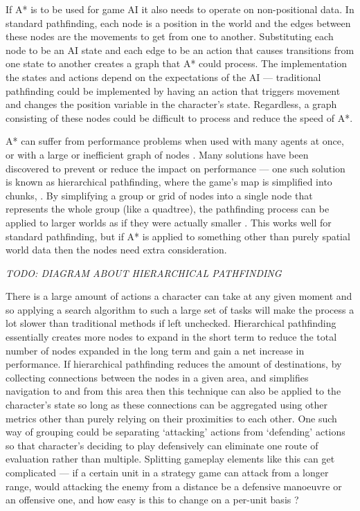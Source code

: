 \documentclass[11pt, a4paper]{article}
\begin{document}
If A* is to be used for game AI it also needs to operate on non-positional data. In standard pathfinding, each node is a position in the world and the edges between these nodes are the movements to get from one to another. Substituting each node to be an AI state and each edge to be an action that causes transitions from one state to another creates a graph that A* could process. The implementation the states and actions depend on the expectations of the AI --- traditional pathfinding could be implemented by having an action that triggers movement and changes the position variable in the character's state. Regardless, a graph consisting of these nodes could be difficult to process and reduce the speed of A*.

A* can suffer from performance problems when used with many agents at once, or with a large or inefficient graph of nodes \parencite{graham2003pathfinding}. Many solutions have been discovered to prevent or reduce the impact on performance --- one such solution is known as hierarchical pathfinding, where the game's map is simplified into chunks, \parencite[126]{cui2011based}. By simplifying a group or grid of nodes into a single node that represents the whole group (like a quadtree), the pathfinding process can be applied to larger worlds as if they were actually smaller \parencite{botea2004near}. This works well for standard pathfinding, but if A* is applied to something other than purely spatial world data then the nodes need extra consideration. 

\emph{TODO: DIAGRAM ABOUT HIERARCHICAL PATHFINDING}

There is a large amount of actions a character can take at any given moment \parencite[62]{nareyek2004ai} and so applying a search algorithm to such a large set of tasks will make the process a lot slower than traditional methods if left unchecked. Hierarchical pathfinding essentially creates more nodes to expand in the short term to reduce the total number of nodes expanded in the long term and gain a net increase in performance. If hierarchical pathfinding reduces the amount of destinations, by collecting connections between the nodes in a given area, and simplifies navigation to and from this area then this technique can also be applied to the character's state so long as these connections can be aggregated using other metrics other than purely relying on their proximities to each other. One such way of grouping  could be separating `attacking' actions from `defending' actions so that character's deciding to play defensively can eliminate one route of evaluation rather than multiple. Splitting gameplay elements like this can get complicated --- if a certain unit in a strategy game can attack from a longer range, would attacking the enemy from a distance be a defensive manoeuvre or an offensive one, and how easy is this to change on a per-unit basis \parencite{weber2011building}?
\end{document}
